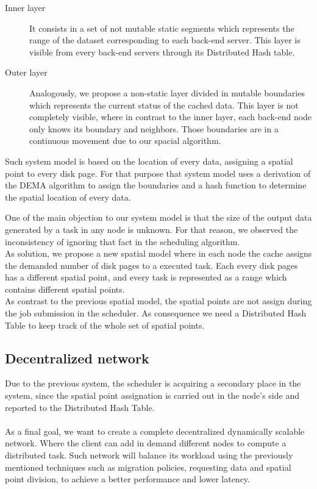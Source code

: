 \documentclass[nocopyrightspace]{sigplanconf}
\begin{document}
\begin{description}
\item [Inner layer]
It consists in a set of not mutable static segments which represents the range of the dataset corresponding
to each back-end server. This layer is visible from every back-end servers through its Distributed Hash table.

\item[Outer layer]
Analogously, we propose a non-static layer divided in mutable boundaries which 
represents the current status of the cached data. This layer is not completely visible, where
in contrast to the inner layer, each back-end node only knows its boundary and neighbors.
Those boundaries are in a continuous movement due to our spacial algorithm.
\end{description}

Such system model is based on the location of every data, assigning a spatial point to every 
disk page. For that purpose that system model uses a derivation of the DEMA algorithm to 
assign the boundaries and a hash function to determine the spatial location of every data.

One of the main objection to our system model is that the size of the output data generated 
by a task in any node is unknown. For that reason, we observed the inconsistency of ignoring
that fact in the scheduling algorithm. \\

As solution, we propose a new spatial model where in each node the cache assigns the demanded
number of disk pages to a executed task. Each every disk pages has a different spatial point,
and every task is represented as a range which contains different spatial points.\\

As contrast to the previous spatial model, the spatial points are not assign during the job submission in 
the scheduler. As consequence we need a Distributed Hash Table to keep track of the whole set of spatial points.


\subsection*{Decentralized network}
Due to the previous system, the scheduler is acquiring a secondary place in the system, since the spatial point 
assignation is carried out in the node's side and reported to the Distributed Hash Table. \\\\
As a final goal, we want to create a complete decentralized dynamically scalable network.
Where the client can add in demand different nodes to compute a distributed task. Such network will
balance its workload using the previously mentioned techniques such as migration policies, requesting data and
spatial point division, to achieve a better performance and lower latency. 
\end{document}
